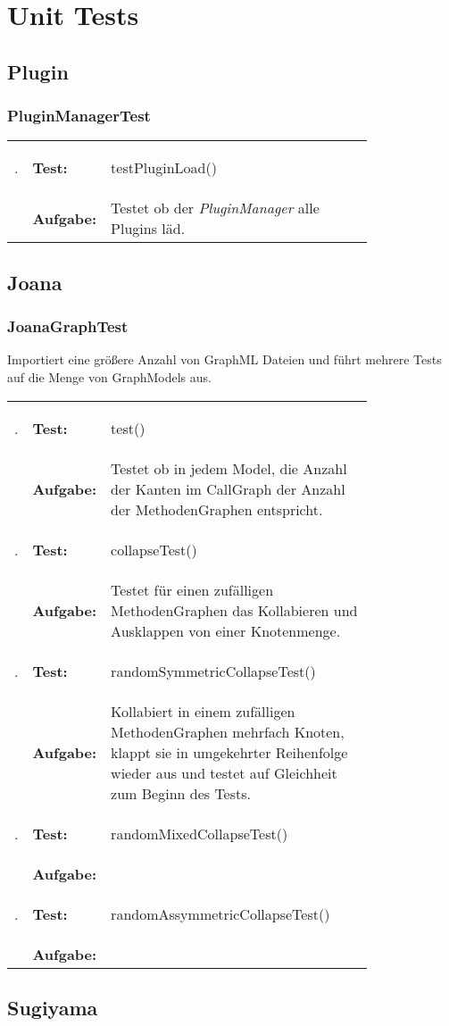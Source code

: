 \chapter{Unit Tests}
\label{ch:unittests}

\newcommand\test[2]{\textbf{\arabic{tnr}}\addtocounter{tnr}{1}. & \textbf{Test:} & #1 \\ & \textbf{Aufgabe:} & #2 \\ [1ex] }

\section{Plugin}
\subsection{PluginManagerTest}
\setcounter{tnr}{1}
\begin{longtable}{llp{0.8\linewidth}}
	\test{testPluginLoad()}{Testet ob der \textit{PluginManager} alle Plugins läd.}
\end{longtable}

\section{Joana}
\subsection{JoanaGraphTest}
Importiert eine größere Anzahl von GraphML Dateien und führt mehrere Tests auf die Menge von GraphModels aus.
\setcounter{tnr}{1}
\begin{longtable}{llp{0.8\linewidth}}
	\test{test()}{Testet ob in jedem Model, die Anzahl der Kanten im CallGraph der Anzahl der MethodenGraphen entspricht.}
	\test{collapseTest()}{Testet für einen zufälligen MethodenGraphen das Kollabieren und Ausklappen von einer Knotenmenge.}
	\test{randomSymmetricCollapseTest()}{Kollabiert in einem zufälligen MethodenGraphen mehrfach Knoten, klappt sie in umgekehrter Reihenfolge wieder aus und testet auf Gleichheit zum Beginn des Tests.}
	\test{randomMixedCollapseTest()}{}
	\test{randomAssymmetricCollapseTest()}{}
\end{longtable}

\newpage

\section{Sugiyama}
